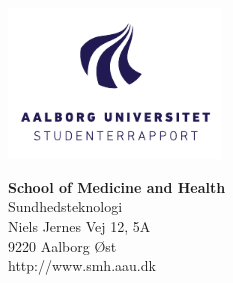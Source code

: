 

{}
\thispagestyle{empty}

\begin{minipage}[t]{0.48\textwidth}
\vspace*{-25pt}			%
\includegraphics[height=4cm]{figures/AAU-logo-stud-DK-RGB}
\end{minipage}
\hfill
\begin{minipage}[t]{0.48\textwidth}
{\small 
\textbf{School of Medicine and Health}\\
Sundhedsteknologi \\
Niels Jernes Vej 12, 5A\\
9220 Aalborg Øst \\
http://www.smh.aau.dk}
\end{minipage}

\vspace*{1cm}

